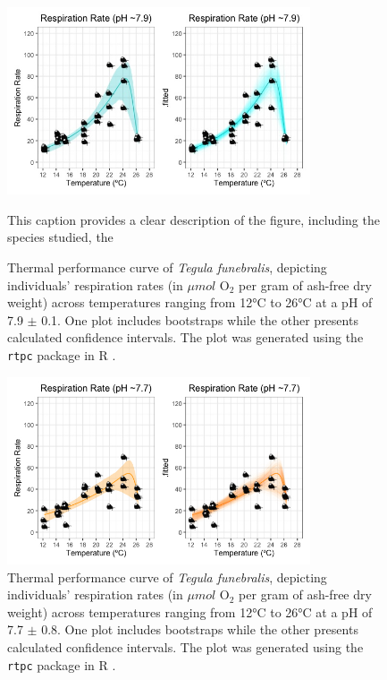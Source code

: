\documentclass[
  12pt,
]{article}
\begin{document}
\begin{figure}[htbp]
  \centering
  \includegraphics[width=0.8\textwidth]{Images/schoolfield-high.jpg}
  \caption{Thermal performance curve of \textit{Tegula funebralis}, depicting individuals' respiration rates (in $\mu mol$ O$_2$ per gram of ash-free dry weight) across temperatures ranging from 12°C to 26°C at a pH of 7.9 $\pm$ 0.1. One plot includes bootstraps while the other presents calculated confidence intervals. The plot was generated using the \texttt{rtpc} package in R \citep{padfield2021rtpc}.}
This caption provides a clear description of the figure, including the species studied, the 
  \label{fig:tpc-schoolfield-high}
\end{figure}

\begin{figure}[htbp]
  \centering
  \includegraphics[width=0.8\textwidth]{Images/schoolfield-low.jpg}
  \caption{Thermal performance curve of \textit{Tegula funebralis}, depicting individuals' respiration rates (in $\mu mol$ O$_2$ per gram of ash-free dry weight) across temperatures ranging from 12°C to 26°C at a pH of 7.7 $\pm$ 0.8. One plot includes bootstraps while the other presents calculated confidence intervals. The plot was generated using the \texttt{rtpc} package in R \citep{padfield2021rtpc}.}
  \label{fig:tpc-schoolfield-low}
\end{figure}
\end{document}
